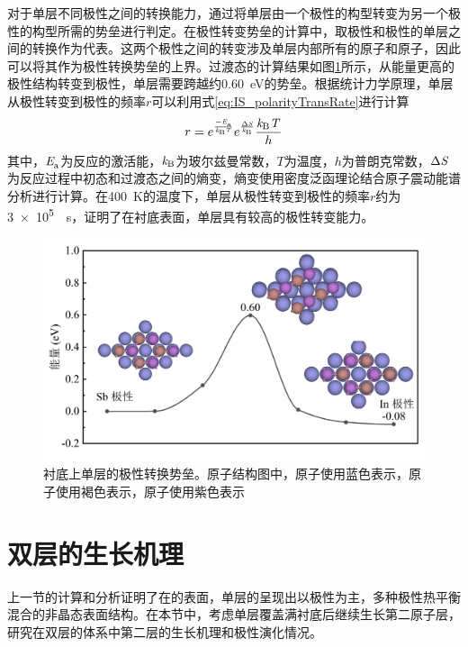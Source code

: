 对于单层不同极性之间的转换能力，通过将单层由一个极性的构型转变为另一个极性的构型所需的势垒进行判定。在极性转变势垒的计算中，取极性和极性的单层之间的转换作为代表。这两个极性之间的转变涉及单层内部所有的原子和原子，因此可以将其作为极性转换势垒的上界。过渡态的计算结果如图\ref{fig:IS_DFT_1LInSb_InPtoSbPNeb}所示，从能量更高的极性结构转变到极性，单层需要跨越约\SI{0.60}{\electronvolt}的势垒。根据统计力学原理，单层从极性转变到极性的频率$r$可以利用式\eqref{eq:IS_polarityTransRate}进行计算\chinesecolon
\begin{equation}
    \label{eq:IS_polarityTransRate}
    r=e^{\frac{-\it E_{\rm a}^{\rm } \it}{\it k_{\rm B} \it T}}e^{\frac{\rm{\Delta} \it S}{\it k_{\rm B} \it}} \frac{\it k_{\rm B} \it T}{h}
\end{equation}
其中，$\it E_{\rm a}^{\rm } \it$为反应的激活能，$\it k_{\rm B} \it$为玻尔兹曼常数，$T$为温度，$h$为普朗克常数，$\rm{\Delta} \it S$为反应过程中初态和过渡态之间的熵变，熵变使用密度泛函理论结合原子震动能谱分析进行计算。在\SI{400}{\kelvin}的温度下，单层从极性转变到极性的频率$r$约为\SI[per-mode = fraction]{3e5}{\per\second}，证明了在衬底表面，单层具有较高的极性转变能力。

\begin{figure}[htb]
    \includegraphics{pic/IS_DFT_1InSb_flipBarrier.png}
    \caption{衬底上单层的极性转换势垒。原子结构图中，原子使用蓝色表示，原子使用褐色表示，原子使用紫色表示}
    \label{fig:IS_DFT_1LInSb_InPtoSbPNeb}
\end{figure}

\section{双层的生长机理}
上一节的计算和分析证明了在的表面，单层的呈现出以极性为主，多种极性热平衡混合的非晶态表面结构。在本节中，考虑单层覆盖满衬底后继续生长第二原子层，研究在双层的体系中第二层的生长机理和极性演化情况。

